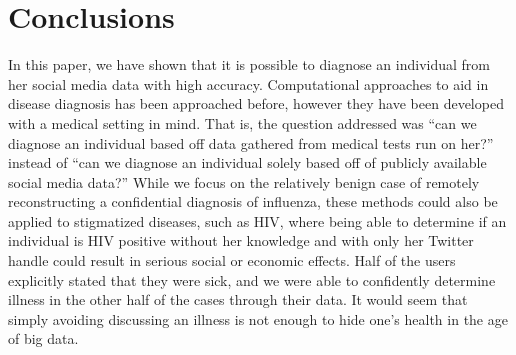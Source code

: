 \documentclass{sig-alternate-2013}
\begin{document}
\section{Conclusions}


In this paper, we have shown that it is possible to diagnose an individual from her social media data with high accuracy. Computational approaches to aid in disease diagnosis has been approached before, however they have been developed with a medical setting in mind. That is, the question addressed was ``can we diagnose an individual based off data gathered from medical tests run on her?'' instead of ``can we diagnose an individual solely based off of publicly available social media data?''  While we focus on the relatively benign case of remotely reconstructing a confidential diagnosis of influenza, these methods could also be applied to stigmatized diseases, such as HIV, where being able to determine if an individual is HIV positive without her knowledge and with only her Twitter handle could result in serious social or economic effects. Half of the users explicitly stated that they were sick, and we were able to confidently determine illness in the other half of the cases through their data. It would seem that simply avoiding discussing an illness is not enough to hide one's health in the age of big data. 
\end{document}
